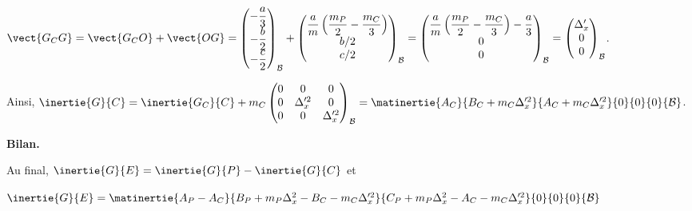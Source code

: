 $\vect{G_C G} = \vect{G_C O} + \vect{O G} = 
\begin{pmatrix}
-\dfrac{a}{3} \\
-\dfrac{b}{2} \\
-\dfrac{c}{2}
\end{pmatrix}_{\mathcal{B}} 
+
\begin{pmatrix}
\dfrac{a}{m} \left( \dfrac{m_P}{2} -  \dfrac{m_C}{3}\right) \\
b/2 \\
c/2
\end{pmatrix}_{\mathcal{B}}=
\begin{pmatrix}
\dfrac{a}{m} \left( \dfrac{m_P}{2} -  \dfrac{m_C}{3}\right) -\dfrac{a}{3}\\
0 \\
0
\end{pmatrix}_{\mathcal{B}}=
\begin{pmatrix}
\Delta_x'\\
0 \\
0
\end{pmatrix}_{\mathcal{B}}$.

Ainsi, 
$\inertie{G}{C} = \inertie{G_C}{C} + m_C\begin{pmatrix}
0 & 0 & 0\\
0 & \Delta_x'^2 & 0 \\
0 & 0 & \Delta_x'^2
\end{pmatrix}_{\mathcal{B}}
= \matinertie{A_C}{B_C+m_C\Delta_x'^2}{A_C+m_C\Delta_x'^2}{0}{0}{0}{\mathcal{B}}
$.

\textbf{Bilan.}

Au final, $\inertie{G}{E} = \inertie{G}{P} - \inertie{G}{C}$ et 

$\inertie{G}{E} = \matinertie{A_P-A_C}{B_P+m_P\Delta_x^2-B_C-m_C\Delta_x'^2}{C_P+m_P\Delta_x^2-A_C-m_C\Delta_x'^2}{0}{0}{0}{\mathcal{B}} $

%
%
%
\else
\fi


\ifprof
\else
{}
\fi